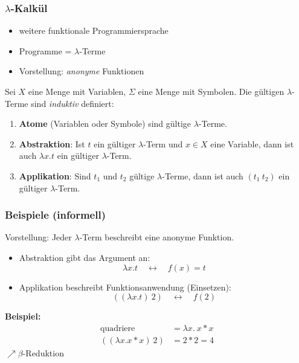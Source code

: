 \documentclass{beamer}
\begin{document}
\begin{frame} \frametitle{$\lambda$-Kalkül}
	\footnotesize
	\begin{itemize}
		\item weitere funktionale Programmiersprache
		\item Programme = $\lambda$-Terme
		\item Vorstellung: \textit{anonyme} Funktionen
	\end{itemize}
	\pause
	
	Sei $X$ eine Menge mit Variablen, $\Sigma$ eine Menge mit Symbolen. Die gültigen $\lambda$-Terme sind \textit{induktiv} definiert:
	\begin{enumerate}[<+->]
		\item \textbf{Atome} (Variablen oder Symbole) sind gültige $\lambda$-Terme.
		\item \textbf{Abstraktion}: Ist $t$ ein gültiger $\lambda$-Term und $x \in X$ eine Variable, dann ist auch $\lambda x . t$ ein gültiger $\lambda$-Term.
		\item \textbf{Applikation}: Sind $t_1$ und $t_2$ gültige $\lambda$-Terme, dann ist auch $(t_1 \ t_2)$ ein gültiger $\lambda$-Term.
	\end{enumerate}
\end{frame}

\begin{frame} \frametitle{Beispiele (informell)}
	\footnotesize
	Vorstellung: Jeder $\lambda$-Term beschreibt eine anonyme Funktion. \pause
	\begin{itemize}[<+->]
		\item Abstraktion gibt das Argument an: 
		\begin{equation*}
		\lambda x . t \quad \leftrightarrow \quad f(x) = t
		\end{equation*}
		\item Applikation beschreibt Funktionsanwendung (Einsetzen): 
		\begin{equation*}
			((\lambda x . t) \ 2) \quad \leftrightarrow \quad f(2)
		\end{equation*}
	\end{itemize}

	\pause
	
	\textbf{Beispiel:}
	\begin{align*}
		\text{quadriere } &= \lambda x . \ x*x \\
		((\lambda x . x*x) \ 2) &= 2 * 2 = 4
	\end{align*}
	$\nearrow \beta$-Reduktion 
\end{frame}
\end{document}
